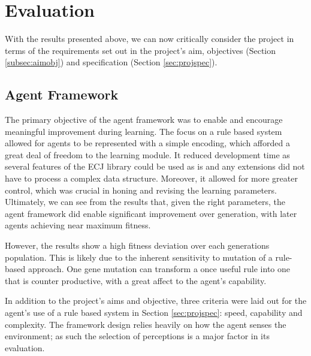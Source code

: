 
\section{Evaluation}
\label{sec:eval}

With the results presented above, we can now critically consider the project in terms of the requirements set out in the project's aim, objectives (Section \ref{subsec:aimobj}) and specification (Section \ref{sec:projspec}).


\subsection{Agent Framework}

The primary objective of the agent framework was to enable and encourage meaningful improvement during learning. The focus on a rule based system allowed for agents to be represented with a simple encoding, which afforded a great deal of freedom to the learning module. It reduced development time as several features of the ECJ library could be used as is and any extensions did not have to process a complex data structure. Moreover, it allowed for more greater control, which was crucial in honing and revising the learning parameters. Ultimately, we can see from the results that, given the right parameters, the agent framework did enable significant improvement over generation, with later agents achieving near maximum fitness.

However, the results show a high fitness deviation over each generations population. This is likely due to the inherent sensitivity to mutation of a rule-based approach. One gene mutation can transform a once useful rule into one that is counter productive, with a great affect to the agent's capability.

In addition to the project's aims and objective, three criteria were laid out for the agent's use of a rule based system in Section \ref{sec:projspec}: speed, capability and complexity. The framework design relies heavily on how the agent senses the environment; as such the selection of perceptions is a major factor in its evaluation.

